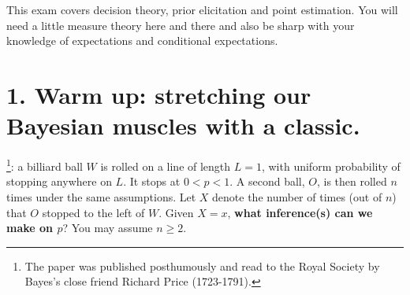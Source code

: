 \documentclass[a4paper,10pt, notitlepage]{report}
\newtheorem{thm}{Theorem}
\newtheorem{remark}[thm]{Remark}
\newtheorem{defn}[thm]{Definition}
\begin{document}
This exam covers decision theory, prior elicitation and  point estimation.
You will need a little measure theory here and there and also be sharp with your knowledge of expectations and conditional expectations.

% 
% 

\section*{1. Warm up: stretching our Bayesian muscles with a classic.}

\cite{Bayes1763}\footnote{The paper was published posthumously and read to the Royal Society by Bayes's close friend Richard Price (1723-1791).}: a billiard ball $W$ is rolled on a line of length $L = 1$, with uniform probability of stopping anywhere on $L$. 
It stops at $0 < p < 1$.
A second ball, $O$, is then rolled $n$ times under the same assumptions.
Let $X$ denote the number of times (out of $n$) that $O$ stopped to the left of $W$.
Given $X=x$, \textbf{what inference(s) can we make on $p$}?
You may assume $n\geq2$.
\end{document}
